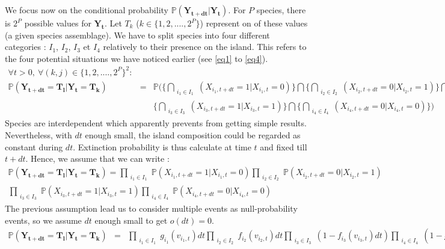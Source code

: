 We focus now on the conditional probability $\mathbb{P}(\mathbf{Y_{t+dt}}|\mathbf{Y_t})$. For $P$ species, there is $2^P$ possible values for $\mathbf{Y_t}$. Let $T_k$ ($k\in \{1, 2,...., 2^P\}$) represent on of these values (a given species assemblage). We have to split species into four different categories : $I_1$, $I_2$, $I_3$ et $I_4$ relatively to their presence on the island. This refers to the four potential situations we have noticed earlier (see \eqref{eq1} to \eqref{eq4}).
\begin{eqnarray}
\nonumber \forall{t} >0, ~\forall{(k,j)} \in \{1, 2,...., 2^P\}^2: & &\\
\nonumber \label{eq12}  \mathbb{P}( \mathbf{\mathbf{Y_{t+dt}}}=\mathbf{T_l}|\mathbf{\mathbf{Y_t}}=\mathbf{T_k})&=&
 \mathbb{P} \bigg(\Big\{\bigcap_{\substack{i_1\in I_1}}(X_{i_1,t+dt}=1|X_{i_1,t}=0)\Big\} \bigcap \Big\{\bigcap_{\substack{i_2\in I_2}}(X_{i_2,t+dt}=0|X_{i_2,t}=1)\Big\}  \bigcap \\
\label{eq13} & &  \Big\{\bigcap_{\substack{i_3\in I_3}} (X_{i_3,t+dt}=1|X_{i_3,t}=1)\Big\} \bigcap  \Big\{\bigcap_{\substack{i_4\in I_4}}(X_{i_4,t+dt}=0|X_{i_4,t}=0)\}\bigg)
\end{eqnarray}
Species are interdependent which apparently prevents from getting simple results. Nevertheless,
with $dt$ enough small, the island composition could be regarded as constant during $dt$. Extinction probability is thus calculate at time $t$ and fixed till $t+dt$. Hence, we assume that we can write :
\begin{eqnarray}
\nonumber \mathbb{P}(\mathbf{\mathbf{Y_{t+dt}}}=\mathbf{T_l}|\mathbf{\mathbf{Y_t}}=\mathbf{T_k})= \prod_{\substack{i_1\in I_1}}\mathbb{P}(X_{i_1,t+dt}=1|X_{i_1,t}=0)\prod_{\substack{i_2\in I_2}}\mathbb{P}(X_{i_2,t+dt}=0|X_{i_2,t}=1)  \\
\label{eq13} \prod_{\substack{i_3\in I_3}}\mathbb{P}(X_{i_3,t+dt}=1|X_{i_3,t}=1) \prod_{\substack{i_4\in I_4}}\mathbb{P}(X_{i_4,t+dt}=0|X_{i_4,t}=0)
\end{eqnarray}
The previous assumption lead us to consider multiple events as null-probability events, so we assume $dt$ enough small to get $o(dt)=0$.
\begin{eqnarray}
\nonumber \mathbb{P}(\mathbf{\mathbf{Y_{t+dt}}}=\mathbf{T_l}|\mathbf{\mathbf{Y_t}}=\mathbf{T_k})&=&\prod_{\substack{i_1\in I_1}}g_{i_1}(v_{i_1,t})dt \prod_{\substack{i_2\in I_2}}f_{i_2}(v_{i_2,t})dt \prod_{\substack{i_3\in I_3}}(1-f_{i_3}(v_{i_3,t})dt )\prod_{\substack{i_4\in I_4}}(1-g_{i_4}(v_{i_4,t})dt) \\
\label{eq2.4}
\end{eqnarray}



